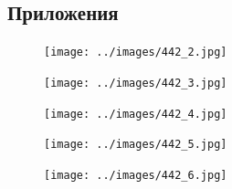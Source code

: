 \documentclass[14pt, a4paper]{report}
\begin{document}
\begin{enumerate}
\section{Приложения}

\begin{figure}[H]
\centering
\texttt{[image: ../images/442\_2.jpg]}
\end{figure}
\begin{figure}[H]
\centering
\texttt{[image: ../images/442\_3.jpg]}
\end{figure}
\begin{figure}[H]
\centering
\texttt{[image: ../images/442\_4.jpg]}
\end{figure}
\begin{figure}[H]
\centering
\texttt{[image: ../images/442\_5.jpg]}
\end{figure}
\begin{figure}[H]
\centering
\texttt{[image: ../images/442\_6.jpg]}
\end{figure}

\end{enumerate}
\end{document}
